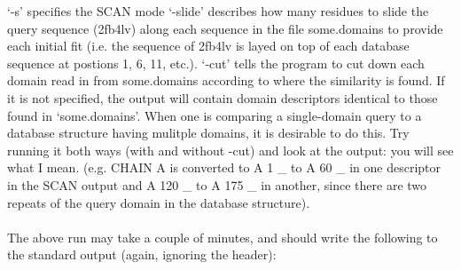 `-s' specifies the SCAN mode `-slide' describes how many residues to slide the
query sequence (2fb4lv) along each sequence in the file some.domains to provide
each initial fit (i.e. the sequence of 2fb4lv is layed on top of each database
sequence at postions 1, 6, 11, etc.). `-cut' tells the program to cut down each
domain read in from some.domains according to where the similarity is found.  
If it is not specified, the output will contain domain descriptors identical to
those found in `some.domains'.  When one is comparing a single-domain query to
a database structure having mulitple domains, it is desirable to do this.   Try running
it both ways (with and without -cut) and look at the output: you will see what I mean.
(e.g. CHAIN A is converted to A 1 \_ to A 60 \_  in one descriptor in the SCAN
output and A 120 \_ to A 175 \_ in another, since there are two repeats of the
query domain in the database structure).\\
\\
The above run may take a couple of minutes, and should write the following to the
standard output (again, ignoring the header):

